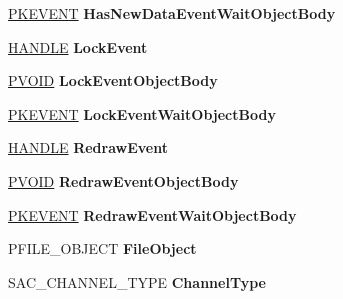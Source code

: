 \begin{DoxyCompactItemize}
\item 
\mbox{\label{struct___s_a_c___c_h_a_n_n_e_l_a34a3b64d719a3451ebbdae106e00c9ac}} 
\hyperlink{struct___k_e_v_e_n_t}{P\+K\+E\+V\+E\+NT} {\bfseries Has\+New\+Data\+Event\+Wait\+Object\+Body}
\item 
\mbox{\label{struct___s_a_c___c_h_a_n_n_e_l_a93e26e34c6f4cf2e33d135d7aa87a6b1}} 
\hyperlink{interfacevoid}{H\+A\+N\+D\+LE} {\bfseries Lock\+Event}
\item 
\mbox{\label{struct___s_a_c___c_h_a_n_n_e_l_ae11d1d2bbcb0bade9bf7aaa7bf820372}} 
\hyperlink{interfacevoid}{P\+V\+O\+ID} {\bfseries Lock\+Event\+Object\+Body}
\item 
\mbox{\label{struct___s_a_c___c_h_a_n_n_e_l_ab36578f8bd66095aa6b1bdebf0691314}} 
\hyperlink{struct___k_e_v_e_n_t}{P\+K\+E\+V\+E\+NT} {\bfseries Lock\+Event\+Wait\+Object\+Body}
\item 
\mbox{\label{struct___s_a_c___c_h_a_n_n_e_l_a3913b98e09d9731f58599c3507e7cf83}} 
\hyperlink{interfacevoid}{H\+A\+N\+D\+LE} {\bfseries Redraw\+Event}
\item 
\mbox{\label{struct___s_a_c___c_h_a_n_n_e_l_a1d6ec38c1105ce10de2cbdb332e12004}} 
\hyperlink{interfacevoid}{P\+V\+O\+ID} {\bfseries Redraw\+Event\+Object\+Body}
\item 
\mbox{\label{struct___s_a_c___c_h_a_n_n_e_l_ab9ceb4c8951ca94d40a4b89792f0377d}} 
\hyperlink{struct___k_e_v_e_n_t}{P\+K\+E\+V\+E\+NT} {\bfseries Redraw\+Event\+Wait\+Object\+Body}
\item 
\mbox{\label{struct___s_a_c___c_h_a_n_n_e_l_a07b42e6b96894bd8f86d07c6138cd60a}} 
P\+F\+I\+L\+E\+\_\+\+O\+B\+J\+E\+CT {\bfseries File\+Object}
\item 
\mbox{\label{struct___s_a_c___c_h_a_n_n_e_l_a31558cbee9929920122f88692dfae85a}} 
S\+A\+C\+\_\+\+C\+H\+A\+N\+N\+E\+L\+\_\+\+T\+Y\+PE {\bfseries Channel\+Type}
\item 

\end{DoxyCompactItemize}
